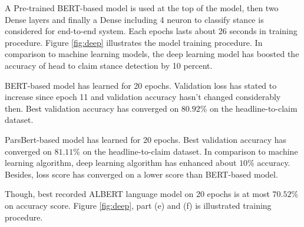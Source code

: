 \label{sec:dl}
A Pre-trained BERT-based model is used at the top of the model, then two Dense layers and finally a Dense including 4 neuron to classify stance is considered for end-to-end system. Each epochs lasts about 26 seconds in training procedure. Figure \ref{fig:deep} illustrates the model training procedure. In comparison to machine learning models, the deep learning model has boosted the accuracy of head to claim stance detection by 10 percent. 

BERT-based model has learned for 20 epochs. Validation loss has stated to increase since epoch 11 and validation accuracy hasn't changed considerably then. Best validation accuracy has converged on $80.92\%$ on the headline-to-claim dataset. 

ParsBert-based model has learned for 20 epochs. Best validation accuracy has converged on $81.11\%$ on the headline-to-claim dataset. In comparison to machine learning algorithm, deep learning algorithm has enhanced about $10\%$ accuracy. Besides, loss score has converged on a lower score than BERT-based model.

Though, best recorded ALBERT language model on 20 epochs is at most $70.52\%$ on accuracy score. Figure \ref{fig:deep}, part (e) and (f) is illustrated training procedure.

